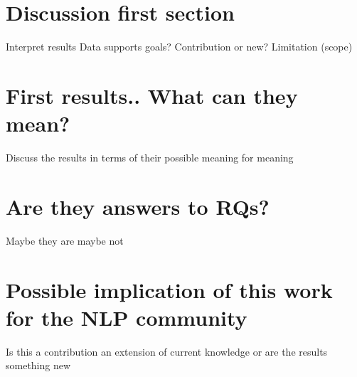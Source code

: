 \section{Discussion first section}
Interpret results
Data supports goals?
Contribution or new?
Limitation (scope)

\section{First results.. What can they mean?}
Discuss the results in terms of their possible meaning for meaning

\section{Are they answers to RQs?}
Maybe they are maybe not

\section{Possible implication of this work for the NLP community}
Is this a contribution an extension of current knowledge or are the results something new

